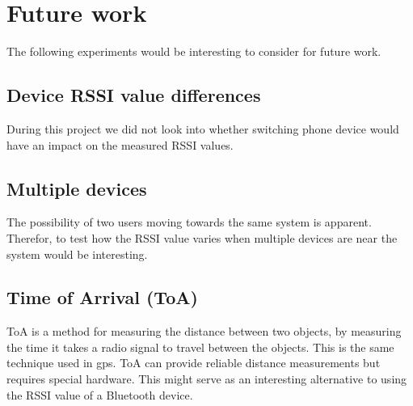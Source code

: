 \chapter{Future work}
The following experiments would be interesting to consider for future work.


\section{Device RSSI value differences}

During this project we did not look into whether switching phone device would have an impact on the measured RSSI values.


\section{Multiple devices}

The possibility of two users moving towards the same system is apparent. Therefor, to test how the RSSI value varies when multiple devices are near the system would be interesting.


\section{Time of Arrival (ToA)}
ToA is a method for measuring the distance between two objects, by measuring the time it takes a radio signal to travel between the objects. This is the same technique used in gps. ToA can provide reliable distance measurements but requires special hardware. This might serve as an interesting alternative to using the RSSI value of a Bluetooth device.
